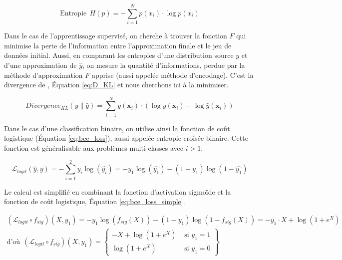\begin{equation} \label{eq:entropy}
\text{Entropie} \ \ H(p) =-\sum_{i=1}^{N} p\left(x_{i}\right) \cdot \log p\left(x_{i}\right)
\end{equation}

Dans le cas de l'apprentissage supervisé, on cherche à trouver la fonction $F$ qui minimise la perte de l'information entre l'approximation finale et le jeu de données initial.
Aussi, en comparant les entropies d'une distribution source $y$ et d'une approximation de $\hat{y}$, on mesure la quantité d'informations, perdue par la méthode d'approximation $F$ apprise (aussi appelée méthode d'encodage).
C'est la divergence de \citeauthor{kullback_information_1951} \cite{kullback_information_1951}, Équation \ref{eq:D_KL} et nous cherchons ici à la minimiser.

\begin{equation} \label{eq:D_KL}
Divergence_{K L}(y \| \hat{y})=\sum_{i=1}^{N} y\left(\mathbf{x}_{i}\right) \cdot\left(\log y\left(\mathbf{x}_{i}\right)-\log \hat{y}\left(\mathbf{x}_{i}\right)\right)
\end{equation}

Dans le cas d'une classification binaire, on utilise ainsi la fonction de coût logistique (Équation \ref{eq:bce_loss}), aussi appelée entropie-croisée binaire. Cette fonction est généralisable aux problèmes multi-classes avec $i > 1$.

\begin{equation} \label{eq:bce_loss}
\mathcal{L}_{logit}\left(\hat{y}, y\right) = -\sum^{2}_{i=1} y_{i} \log \left(\hat{y_{i}}\right) = - y_{1} \log \left(\hat{y_{1}}\right) -\left(1-y_{1}\right) \log \left(1-\hat{y_{1}}\right)
\end{equation}

Le calcul est simplifié en combinant la fonction d'activation sigmoïde et la fonction de coût logistique, Équation \ref{eq:bce_loss_simple}.

\begin{equation} \label{eq:bce_loss_simple}
\begin{split}
\left(\mathcal{L}_{logit} \circ f_{sig}\right)\left(X, y_{1}\right) = - y_{1} \log \left(f_{sig}(X)\right) -\left(1-y_{1}\right) \log \left(1-f_{sig}(X)\right) = -y_1 \cdot X +\log \left(1+e^{X}\right)
\\
\text{d'où} \ \ \left(\mathcal{L}_{logit} \circ f_{sig}\right)\left(X, y_{1}\right) = \left\{\begin{array}{cc}{- X +\log \left(1+e^{X}\right)} & {\text { si } y_{1}=1} \\ {\log \left(1+e^{X}\right)} & {\text { si } y_{1}=0}\end{array}\right\}
\end{split}
\end{equation}

